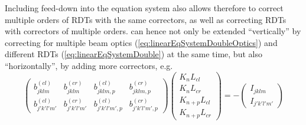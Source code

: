 Including feed-down into the equation system also allows therefore to correct multiple orders of RDTs with the same correctors, 
as well as correcting RDTs with correctors of multiple orders.
 can hence not only be extended ``vertically'' by correcting for multiple beam optics (\cref{eq:linearEqSystemDoubleOptics})
 and different RDTs (\cref{eq:linearEqSystemDouble}) at the same time, 
but also ``horizontally'', by adding more correctors, e.g.
%
\begin{equation}    
    \label{eq:linearEqSystemDoubleCorrectors}
        \begin{pmatrix}
            b_{jklm}^{(cl)} & b_{jklm}^{(cr)} & b_{jklm,p}^{(cl)} & b_{jklm,p}^{(cr)} \\
            b_{j'k'l'm'}^{(cl)} & b_{j'k'l'm'}^{(cr)} & b_{j'k'l'm',p}^{(cl)} & b_{j'k'l'm',p}^{(cr)}
        \end{pmatrix}
        \begin{pmatrix}
            K_{n}L_{cl} \\ 
            K_{n}L_{cr} \\
            K_{n+p}L_{cl} \\ 
            K_{n+p}L_{cr}
        \end{pmatrix}
        = - 
        \begin{pmatrix}
            I_{jklm} \\ 
            I_{j'k'l'm'} 
        \end{pmatrix}
\end{equation}